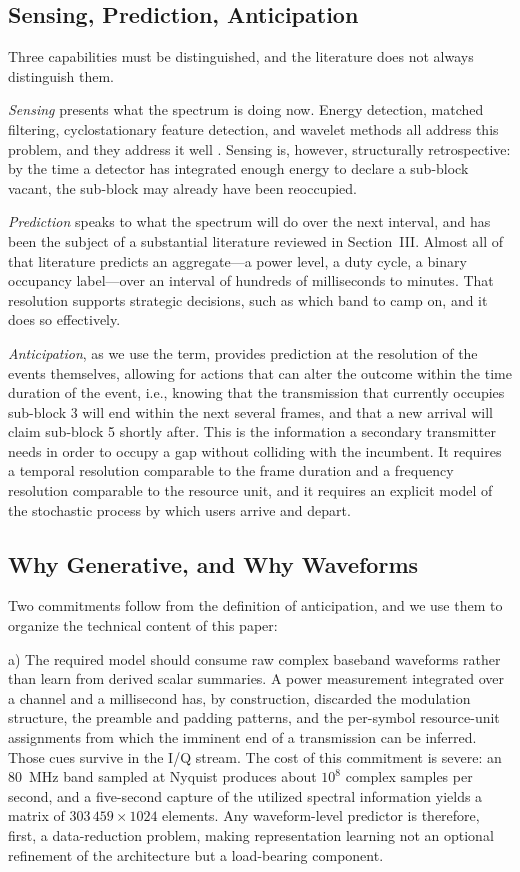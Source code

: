 \documentclass[lettersize,journal]{IEEEtran}
\begin{document}
\subsection{\textbf{Sensing, Prediction, Anticipation}}
Three capabilities must be distinguished, and the literature does not
always distinguish them.

\emph{Sensing} presents what the spectrum is doing now.
Energy detection, matched filtering, cyclostationary feature detection,
and wavelet methods all address this problem, and they address it well
\cite{Yucek2009, Muzaffar2024, FontSegura2010, Tian2006}.
Sensing is, however, structurally retrospective: by the time a detector has
integrated enough energy to declare a sub-block vacant, the sub-block
may already have been reoccupied.

\emph{Prediction} speaks to what the spectrum will do over the next
interval, and has been the subject of a substantial literature reviewed in
Section~III.
Almost all of that literature predicts an
aggregate---a power level, a duty cycle, a binary occupancy
label---over an interval of hundreds of milliseconds to minutes.
That resolution supports strategic decisions, such as which band to camp on,
and it does so effectively.

\emph{Anticipation}, as we use the term, provides prediction at the resolution
of the events themselves, allowing for actions that can alter the outcome
within the time duration of the event, i.e., knowing that the transmission that
currently occupies sub-block 3 will end within the next several frames, and that
a new arrival will claim sub-block 5 shortly after.
This is the information a
secondary transmitter needs in order to occupy a gap without
colliding with the incumbent.
It requires a temporal resolution
comparable to the frame duration and a frequency resolution comparable
to the resource unit, and it requires an explicit model of the
stochastic process by which users arrive and depart.

\subsection{\textbf{Why Generative, and Why Waveforms}}
Two commitments follow from the definition of anticipation, and we use them to
organize the technical content of this paper:

a) The required model should consume raw complex baseband
waveforms rather than learn from derived scalar summaries.
A power measurement integrated over a channel and a millisecond has, by
construction, discarded the modulation structure, the preamble and padding
patterns, and the per-symbol resource-unit assignments from which the
imminent end of a transmission can be inferred.
Those cues survive in the I/Q stream.
The cost of this commitment is severe: an 80~MHz band sampled at
Nyquist produces about $10^8$ complex samples per second, and
a five-second capture of the utilized spectral information yields a matrix of
$303\,459 \times 1024$ elements.
Any waveform-level predictor is therefore, first, a data-reduction problem,
making representation learning not an optional refinement of the architecture
but a load-bearing component.
\end{document}
